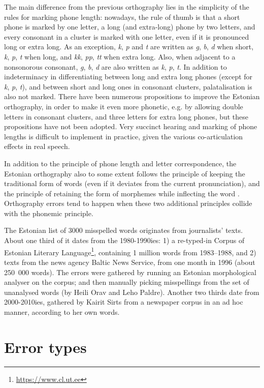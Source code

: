 \documentclass{flammie}
\begin{document}
The main difference from the previous orthography lies in the simplicity of the
rules for marking phone length: nowadays, the rule of thumb is that a short
phone is marked by one letter, a long (and extra-long) phone by two letters, and
every consonant in a cluster is marked with one letter, even if it is pronounced
long or extra long. As an exception, \textit{k}, \textit{p} and \textit{t} are
written as \textit{g}, \textit{b}, \textit{d} when short, \textit{k},
\textit{p}, \textit{t} when long, and \textit{kk}, \textit{pp}, \textit{tt} when
extra long. Also, when adjacent to a nonsonorous consonant, \textit{g},
\textit{b}, \textit{d} are also written as \textit{k}, \textit{p}, \textit{t}.
In addition to indeterminacy in differentiating between long and extra long
phones (except for \textit{k}, \textit{p}, \textit{t}), and between short and
long ones in consonant clusters, palatalisation is also not marked. There have
been numerous propositions to improve the Estonian orthography, in order to make
it even more phonetic, e.g. by allowing double letters in consonant clusters,
and three letters for extra long phones, but these propositions have not been
adopted. Very succinct hearing and marking of phone lengths is difficult to
implement in practice, given the various co-articulation effects in real speech.

In addition to the principle of phone length and letter correspondence, the
Estonian orthography also to some extent follows the principle of keeping the
traditional form of words (even if it deviates from the current pronunciation),
and the principle of retaining the form of morphemes while inflecting the word
\cite{EKK}. Orthography errors tend to happen when these two additional
principles collide with the phonemic principle.

The Estonian list of 3000 misspelled words originates from journalists' texts.
About one third of it dates from the 1980-1990ies: 1) a re-typed-in Corpus of
Estonian Literary Language\footnote{\url{https://www.cl.ut.ee}}, containing 1
million words from 1983--1988, and 2) texts from the news agency Baltic News
Service, from one month in 1996 (about 250~000 words). The errors were gathered
by running an Estonian morphological analyser on the corpus; and then manually
picking misspellings from the set of unanalysed words (by Heili Orav and Leho
Paldre). Another two thirds date from 2000-2010ies, gathered by Kairit Sirts
from a newspaper corpus in an ad hoc manner, according to her own words.

\section{Error types}
\end{document}
